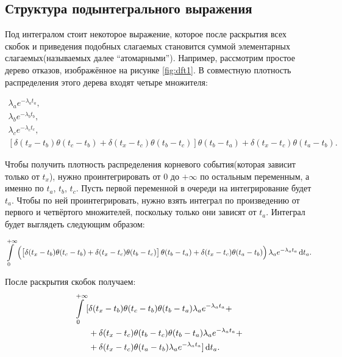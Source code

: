 \documentclass[a4paper, 12pt]{article}
\begin{document}
\subsection{Структура подынтегрального выражения}

Под интегралом стоит некоторое выражение, которое после раскрытия всех скобок и приведения подобных слагаемых становится суммой элементарных слагаемых(называемых далее ``атомарными''). Например, рассмотрим простое дерево отказов, изображённое на рисунке \ref{fig:dft1}. В совместную плотность распределения этого дерева входят четыре множителя:

\begin{equation*}
  \begin{array}{l}
    \lambda_a e^{-\lambda_a t_a}, \\
    \lambda_b e^{-\lambda_b t_b}, \\
    \lambda_c e^{-\lambda_c t_c}, \\
    \left[\delta(t_x - t_b) \theta(t_c - t_b) + \delta(t_x - t_c) \theta(t_b - t_c)\right]
    \theta(t_b - t_a) + \delta(t_x - t_c) \theta(t_a - t_b).
  \end{array}
\end{equation*}

Чтобы получить плотность распределения корневого события(которая зависит только от $t_x$), нужно проинтегрировать от $0$ до $+\infty$ по остальным переменным, а именно по $t_a$, $t_b$, $t_c$. Пусть первой переменной в очереди на интегрирование будет $t_a$. Чтобы по ней проинтегрировать, нужно взять интеграл по произведению от первого и четвёртого множителей, поскольку только они зависят от $t_a$. Интеграл будет выглядеть следующим образом:

\begin{equation*}
  \int\limits_0^{+\infty}
  \left(
    \left[
      \delta(t_x - t_b) \theta(t_c - t_b) + \delta(t_x - t_c) \theta(t_b - t_c)
    \right]
    \theta(t_b - t_a) + \delta(t_x - t_c) \theta(t_a - t_b)
  \right)
  \lambda_a e^{-\lambda_a t_a} \dif t_a.
\end{equation*}

После раскрытия скобок получаем:
\begin{align*}
  \int\limits_0^{+\infty}
  [
    & \delta(t_x - t_b) \theta(t_c - t_b) \theta(t_b - t_a) \lambda_a e^{-\lambda_a t_a} + \\
    & + \delta(t_x - t_c) \theta(t_b - t_c) \theta(t_b - t_a) \lambda_a e^{-\lambda_a t_a} + \\
    & + \delta(t_x - t_c) \theta(t_a - t_b) \lambda_a e^{-\lambda_a t_a}
  ] \dif t_a.
\end{align*}
\end{document}
